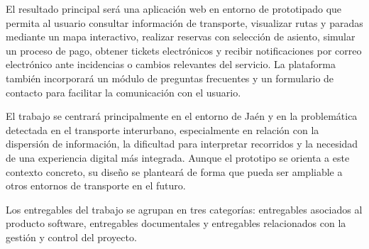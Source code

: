 El resultado principal será una aplicación web en entorno de prototipado que permita al usuario consultar información de transporte, visualizar rutas y paradas mediante un mapa interactivo, realizar reservas con selección de asiento, simular un proceso de pago, obtener tickets electrónicos y recibir notificaciones por correo electrónico ante incidencias o cambios relevantes del servicio. La plataforma también incorporará un módulo de preguntas frecuentes y un formulario de contacto para facilitar la comunicación con el usuario.

El trabajo se centrará principalmente en el entorno de Jaén y en la problemática detectada en el transporte interurbano, especialmente en relación con la dispersión de información, la dificultad para interpretar recorridos y la necesidad de una experiencia digital más integrada. Aunque el prototipo se orienta a este contexto concreto, su diseño se planteará de forma que pueda ser ampliable a otros entornos de transporte en el futuro.

Los entregables del trabajo se agrupan en tres categorías: entregables asociados al producto software, entregables documentales y entregables relacionados con la gestión y control del proyecto.

